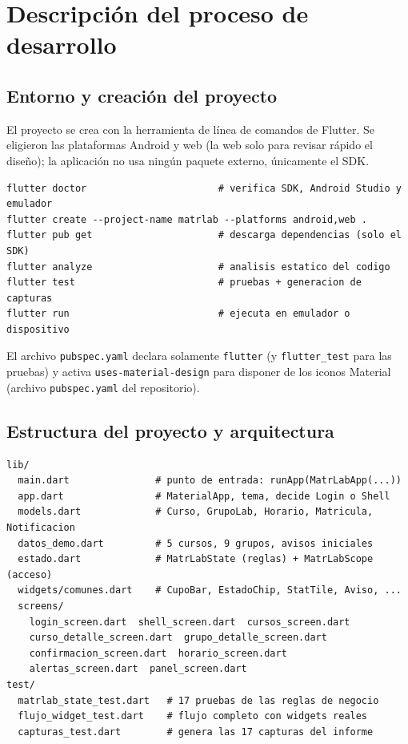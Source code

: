 \section{Descripción del proceso de desarrollo}
\label{sec:desarrollo}

\subsection{Entorno y creación del proyecto}
El proyecto se crea con la herramienta de línea de comandos de Flutter. Se eligieron las plataformas Android y web (la web solo para revisar rápido el diseño); la aplicación no usa ningún paquete externo, únicamente el SDK.

\begin{lstlisting}[style=consola,caption={Comandos para preparar y verificar el proyecto.},captionpos=b]
flutter doctor                       # verifica SDK, Android Studio y emulador
flutter create --project-name matrlab --platforms android,web .
flutter pub get                      # descarga dependencias (solo el SDK)
flutter analyze                      # analisis estatico del codigo
flutter test                         # pruebas + generacion de capturas
flutter run                          # ejecuta en emulador o dispositivo
\end{lstlisting}

El archivo \texttt{pubspec.yaml} declara solamente \texttt{flutter} (y \texttt{flutter\_test} para las pruebas) y activa \texttt{uses-material-design} para disponer de los iconos Material (archivo \texttt{pubspec.yaml} del repositorio).

\subsection{Estructura del proyecto y arquitectura}
\begin{lstlisting}[style=consola,caption={Estructura de carpetas de \texttt{lib/} y \texttt{test/}.},captionpos=b]
lib/
  main.dart               # punto de entrada: runApp(MatrLabApp(...))
  app.dart                # MaterialApp, tema, decide Login o Shell
  models.dart             # Curso, GrupoLab, Horario, Matricula, Notificacion
  datos_demo.dart         # 5 cursos, 9 grupos, avisos iniciales
  estado.dart             # MatrLabState (reglas) + MatrLabScope (acceso)
  widgets/comunes.dart    # CupoBar, EstadoChip, StatTile, Aviso, ...
  screens/
    login_screen.dart  shell_screen.dart  cursos_screen.dart
    curso_detalle_screen.dart  grupo_detalle_screen.dart
    confirmacion_screen.dart  horario_screen.dart
    alertas_screen.dart  panel_screen.dart
test/
  matrlab_state_test.dart   # 17 pruebas de las reglas de negocio
  flujo_widget_test.dart    # flujo completo con widgets reales
  capturas_test.dart        # genera las 17 capturas del informe
\end{lstlisting}

